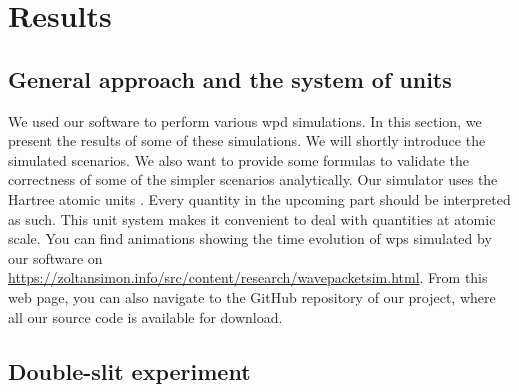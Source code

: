 \section{Results}
\label{sec:results}

\subsection{General approach and the system of units}

We used our software to perform various \acrshort{wpd} simulations.
In this section, we present the results of some of these simulations.
We will shortly introduce the simulated scenarios.
We also want to provide some formulas to validate the correctness of some of the simpler scenarios analytically.
Our simulator uses the Hartree atomic units \cite{hartree_1928}.
Every quantity in the upcoming part should be interpreted as such.
This unit system makes it convenient to deal with quantities at atomic scale.
You can find animations showing the time evolution of \acrshort{wp}s simulated by our software on  \url{https://zoltansimon.info/src/content/research/wavepacketsim.html}.
From this web page, you can also navigate to the GitHub repository of our project, where all our source code is available for download.

\subsection{Double-slit experiment}

